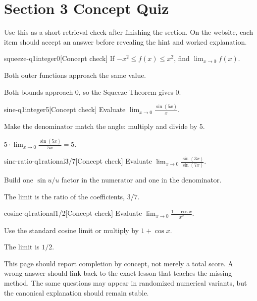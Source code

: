 \section*{Section 3 Concept Quiz}

Use this as a short retrieval check after finishing the section. On the website, each item should accept an answer before revealing the hint and worked explanation.

\begin{bgcheck}{squeeze-q1}{integer}{0}[Concept check]
If \(-x^2\le f(x)\le x^2\), find \(\lim_{x\to0}f(x)\).
\begin{bghint}
Both outer functions approach the same value.
\end{bghint}
\begin{bgreveal}
Both bounds approach \(0\), so the Squeeze Theorem gives \(0\).
\end{bgreveal}
\end{bgcheck}

\begin{bgcheck}{sine-q1}{integer}{5}[Concept check]
Evaluate \(\lim_{x\to0}\frac{\sin(5x)}{x}\).
\begin{bghint}
Make the denominator match the angle: multiply and divide by \(5\).
\end{bghint}
\begin{bgreveal}
\(5\cdot\lim_{x\to0}\frac{\sin(5x)}{5x}=5\).
\end{bgreveal}
\end{bgcheck}

\begin{bgcheck}{sine-ratio-q1}{rational}{3/7}[Concept check]
Evaluate \(\lim_{x\to0}\frac{\sin(3x)}{\sin(7x)}\).
\begin{bghint}
Build one \(\sin u/u\) factor in the numerator and one in the denominator.
\end{bghint}
\begin{bgreveal}
The limit is the ratio of the coefficients, \(3/7\).
\end{bgreveal}
\end{bgcheck}

\begin{bgcheck}{cosine-q1}{rational}{1/2}[Concept check]
Evaluate \(\lim_{x\to0}\frac{1-\cos x}{x^2}\).
\begin{bghint}
Use the standard cosine limit or multiply by \(1+\cos x\).
\end{bghint}
\begin{bgreveal}
The limit is \(1/2\).
\end{bgreveal}
\end{bgcheck}

\begin{bgsummary}[title={Quiz use on the website}]
This page should report completion by concept, not merely a total score. A wrong answer should link back to the exact lesson that teaches the missing method. The same questions may appear in randomized numerical variants, but the canonical explanation should remain stable.
\end{bgsummary}
